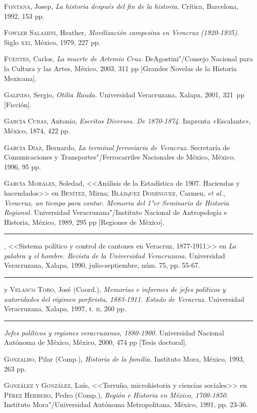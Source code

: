 \documentclass[14pt,twoside,final]{extbook} %
\begin{document}
\textsc{Fontana}, Josep, \emph{La historia después del fin de la historia.} Crítica, Barcelona, 1992, 153 pp.

\textsc{Fowler Salamini}, Heather, \emph{Movilización campesina en Veracruz (1920-1935).} Siglo \textsc{xxi}, México, 1979, 227 pp.

\textsc{Fuentes}, Carlos, \emph{La muerte de Artemio Cruz.} DeAgostini"/Consejo Nacional para la Cultura y las Artes, México, 2003, 311 pp [Grandes Novelas de la Historia Mexicana].

\textsc{Galindo}, Sergio, \emph{Otilia Rauda.} Universidad Veracruzana, Xalapa, 2001, 321~pp [Ficción].

\textsc{García Cubas}, Antonio, \emph{Escritos Diversos. De 1870-1874.} Imprenta «Escalante», México, 1874, 422 pp. \pagebreak[4]

\textsc{García Díaz}, Bernardo, \emph{La terminal ferroviaria de Veracruz.} Secretaría de Comunicaciones y Transportes"/Ferrocarriles Nacionales de México, México, 1996, 95 pp.

\textsc{García Morales}, Soledad, <<Análisis de la Estadística de 1907. Haciendas y
hacendados>> en \textsc{Benítez}, Mirna; \textsc{Blázquez Domínguez}, Carmen,
\emph{et al.}, \emph{Veracruz, un tiempo para contar. Memoria del 1"er Seminario de Historia Regional.} Universidad Veracruzana"/Instituto Nacional de Antropología e Historia, México, 1989, 295 pp [Regiones de México].

\rule{1cm}{0.4pt}, <<Sistema político y control de cantones en Veracruz, 1877-1911>> en \emph{La palabra y el hombre. Revista de la Universidad Veracruzana.} Universidad Veracruzana, Xalapa, 1990, julio-septiembre, núm. 75, pp. 55-67.

\rule{1cm}{0.4pt} y \textsc{Velasco Toro}, José (Coord.), \emph{Memorias e informes de jefes políticos y autoridades del régimen porfirista, 1883-1911. Estado de Veracruz.} Universidad
Veracruzana, Xalapa, 1997, t. \textsc{ii}, 260 pp.

\rule{1cm}{0.4pt} \emph{Jefes políticos y regiones veracruzanas, 1880-1900.} Universidad Nacional Autónoma de México, México, 2000, 474 pp [Tesis doctoral].

\textsc{Gonzalbo}, Pilar (Comp.), \emph{Historia de la familia.} Instituto Mora, México, 1993, 263 pp.

\textsc{González y González}, Luís, <<Terruño, microhistoria y ciencias sociales>> en \textsc{Pérez Herrero}, Pedro (Comp.), \emph{Región e Historia en México, \mbox{1700-1850}.} Instituto Mora"/Universidad Autónoma Metropolitana, México, 1991, pp. 23-36.
\end{document}
